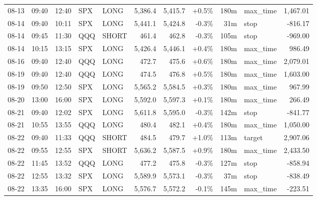 \documentclass[11pt,a4paper,twoside]{article}
\begin{document}
\begin{center}
\begin{longtable}{>{\color{txtmain}}l l l l l r r r r >{\color{txtmain}}l r}
08-13 & 09:40 & 12:40 & SPX & LONG & 5,386.4 & 5,415.7 & \textcolor{wingreen}{+0.5\%} & 180m & max\_time & \textcolor{wingreen}{1,467.01} \\
08-14 & 09:40 & 10:11 & SPX & LONG & 5,441.1 & 5,424.8 & \textcolor{lossred}{-0.3\%} & 31m & stop & \textcolor{lossred}{-816.17} \\
08-14 & 09:45 & 11:30 & QQQ & SHORT & 461.4 & 462.8 & \textcolor{lossred}{-0.3\%} & 105m & stop & \textcolor{lossred}{-969.00} \\
08-14 & 10:15 & 13:15 & SPX & LONG & 5,426.4 & 5,446.1 & \textcolor{wingreen}{+0.4\%} & 180m & max\_time & \textcolor{wingreen}{986.49} \\
08-16 & 09:40 & 12:40 & QQQ & LONG & 472.7 & 475.6 & \textcolor{wingreen}{+0.6\%} & 180m & max\_time & \textcolor{wingreen}{2,079.01} \\
08-19 & 09:40 & 12:40 & QQQ & LONG & 474.5 & 476.8 & \textcolor{wingreen}{+0.5\%} & 180m & max\_time & \textcolor{wingreen}{1,603.00} \\
08-19 & 09:50 & 12:50 & SPX & LONG & 5,565.2 & 5,584.5 & \textcolor{wingreen}{+0.3\%} & 180m & max\_time & \textcolor{wingreen}{967.99} \\
08-20 & 13:00 & 16:00 & SPX & LONG & 5,592.0 & 5,597.3 & \textcolor{wingreen}{+0.1\%} & 180m & max\_time & \textcolor{wingreen}{266.49} \\
08-21 & 09:40 & 12:02 & SPX & LONG & 5,611.8 & 5,595.0 & \textcolor{lossred}{-0.3\%} & 142m & stop & \textcolor{lossred}{-841.77} \\
08-21 & 10:55 & 13:55 & QQQ & LONG & 480.4 & 482.1 & \textcolor{wingreen}{+0.4\%} & 180m & max\_time & \textcolor{wingreen}{1,050.00} \\
08-22 & 09:40 & 11:33 & QQQ & SHORT & 484.5 & 479.7 & \textcolor{wingreen}{+1.0\%} & 113m & target & \textcolor{wingreen}{2,907.06} \\
08-22 & 09:55 & 12:55 & SPX & SHORT & 5,636.2 & 5,587.5 & \textcolor{wingreen}{+0.9\%} & 180m & max\_time & \textcolor{wingreen}{2,433.50} \\
08-22 & 11:45 & 13:52 & QQQ & LONG & 477.2 & 475.8 & \textcolor{lossred}{-0.3\%} & 127m & stop & \textcolor{lossred}{-858.94} \\
08-22 & 12:55 & 13:32 & SPX & LONG & 5,589.9 & 5,573.1 & \textcolor{lossred}{-0.3\%} & 37m & stop & \textcolor{lossred}{-838.49} \\
08-22 & 13:35 & 16:00 & SPX & LONG & 5,576.7 & 5,572.2 & \textcolor{lossred}{-0.1\%} & 145m & max\_time & \textcolor{lossred}{-223.51} \\

\end{longtable}
\end{center}
\end{document}
